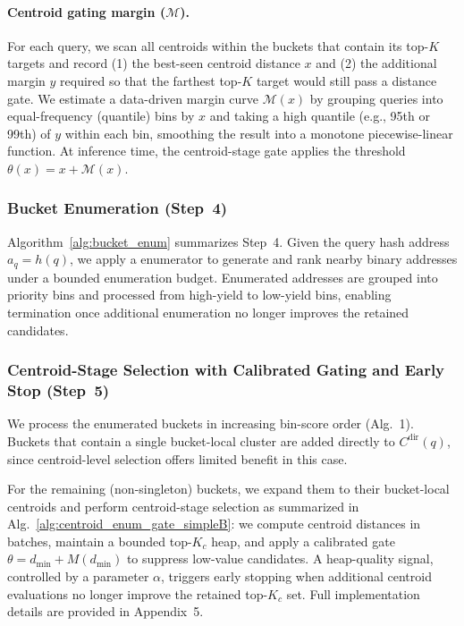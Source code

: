\documentclass[sigconf, nonacm]{acmart}
\begin{document}
\paragraph{Centroid gating margin ($\mathcal{M}$).}
For each query, we scan all centroids within the buckets that contain its top-$K$ targets and record (1) the best-seen centroid distance $x$ and (2) the additional margin $y$ required so that the farthest top-$K$ target would still pass a distance gate.
We estimate a data-driven margin curve $\mathcal{M}(x)$ by grouping queries into equal-frequency (quantile) bins by $x$ and taking a high quantile (e.g., 95th or 99th) of $y$ within each bin, smoothing the result into a monotone piecewise-linear function.
At inference time, the centroid-stage gate applies the threshold $\theta(x)=x+\mathcal{M}(x)$.


\subsubsection{Bucket Enumeration (Step~4)}
\label{subsubsec:dp-enum}

Algorithm~\ref{alg:bucket_enum} summarizes Step~4. Given the query hash address $a_q=h(q)$, we apply a enumerator to generate and rank nearby binary addresses under a bounded enumeration budget. Enumerated addresses are grouped into priority bins and processed from high-yield to low-yield bins, enabling termination once additional enumeration no longer improves the retained candidates.



\subsubsection{Centroid-Stage Selection with Calibrated Gating and Early Stop (Step~5)}
\label{subsubsec:centroid-stage}


We process the enumerated buckets in increasing bin-score order (Alg.~1).
Buckets that contain a single bucket-local cluster are added directly to $C^{\mathrm{dir}}(q)$,
since centroid-level selection offers limited benefit in this case.

For the remaining (non-singleton) buckets, we expand them to their bucket-local centroids and perform centroid-stage selection as summarized in Alg.~\ref{alg:centroid_enum_gate_simpleB}: we compute centroid distances in batches, maintain a bounded top-$K_c$ heap, and apply a calibrated gate $\theta = d_{\min} + M(d_{\min})$ to suppress low-value candidates. A heap-quality signal, controlled by a parameter $\alpha$, triggers early stopping when additional centroid evaluations no longer improve the retained top-$K_c$ set. Full implementation details are provided in Appendix~5.
\end{document}
